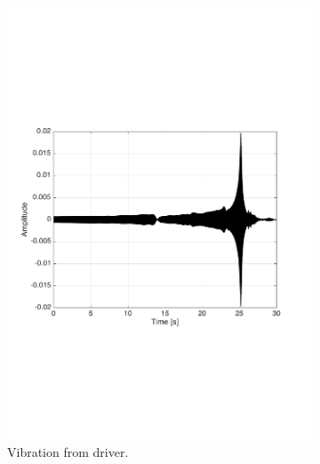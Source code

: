 \begin{figure}[H]
\centering
\begin{subfigure}[t]{0.335\textwidth}
	\includegraphics[width=1\textwidth]{figures/raw_driver1.pdf}
	\caption{Vibration from driver.}
	\label{fig:raw_driver1}
\end{subfigure}
\begin{subfigure}[t]{0.3\textwidth}

\end{subfigure}
\end{figure}
